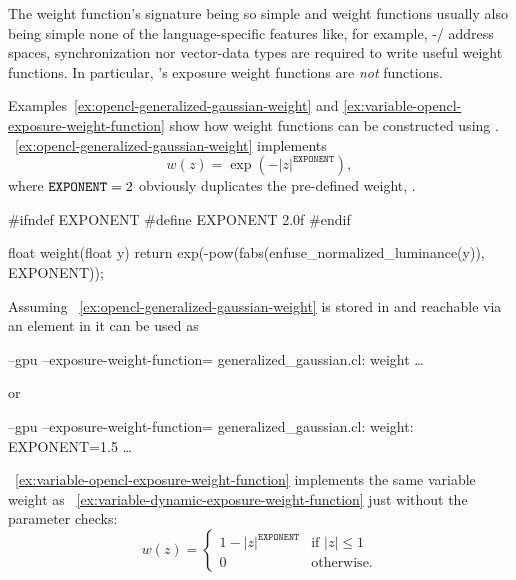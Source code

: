 \begin{geeknote}
  The weight function's signature being so simple and weight functions usually also being simple
  none of the language-specific features like, for example, -\slash{}
  address spaces, synchronization nor vector-data types are required to write useful weight
  functions.  In particular, \App's  exposure weight functions are \emph{not}
   functions.
\end{geeknote}

Examples~\ref{ex:opencl-generalized-gaussian-weight} and
\ref{ex:variable-opencl-exposure-weight-function} show how weight functions can be constructed
using .  \exampleName~\ref{ex:opencl-generalized-gaussian-weight} implements
\[
    w(z) = \exp\left(-|z|^{\mathtt{EXPONENT}}\right),
\]
where $\texttt{EXPONENT} = 2$ obviously duplicates the pre-defined  weight,
.

\begin{exemplar}
  \begin{cxxlisting}
#ifndef EXPONENT
#define EXPONENT 2.0f
#endif

float weight(float y)
{
    return exp(-pow(fabs(enfuse_normalized_luminance(y)),
                    EXPONENT));
}
  \end{cxxlisting}

  \caption[Generalized  weight function]%
          {\label{ex:opencl-generalized-gaussian-weight}%
            Generalized  weight function written in .  Note
            the definition of the default parameter~.}
\end{exemplar}

Assuming \exampleName~\ref{ex:opencl-generalized-gaussian-weight} is stored in
 and reachable via an element in
 it can be used as
\begin{literal}
  \app{} --gpu --exposure-weight-function=\feasiblebreak
  generalized\_gaussian.cl:\feasiblebreak
  weight \dots
\end{literal}
or
\begin{literal}
  \app{} --gpu --exposure-weight-function=\feasiblebreak
  generalized\_gaussian.cl:\feasiblebreak
  weight:\feasiblebreak
  EXPONENT=1.5 \dots
\end{literal}

\exampleName~\ref{ex:variable-opencl-exposure-weight-function} implements the same variable
weight as \exampleName~\ref{ex:variable-dynamic-exposure-weight-function} just without the
parameter checks:
\[
    w(z) =
    \left\{
      \begin{array}{cl}
        1 - |z|^{\mathtt{EXPONENT}} & \mbox{if } |z| \leq 1 \\
        0                         & \mbox{otherwise.}
      \end{array}
    \right.
\]

